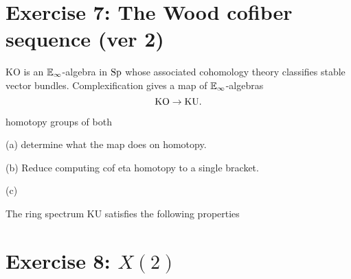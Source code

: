 \documentclass[reqno]{amsart}
\begin{document}
\section{\bf Exercise 7: The Wood cofiber sequence (ver 2)}

$\mathrm{KO}$ is an $\mathbb{E}_\infty$-algebra in $\mathrm{Sp}$ whose associated cohomology theory
classifies stable vector bundles.
Complexification gives a map of $\mathbb{E}_\infty$-algebras
\[ \mathrm{KO} \to \mathrm{KU}. \]

homotopy groups of both

(a) determine what the map does on homotopy.


(b) Reduce computing cof eta homotopy to a single bracket.



(c)

The ring spectrum $\mathrm{KU}$ satisfies the following properties


\section{\bf Exercise 8: $X(2)$}






\end{document}
